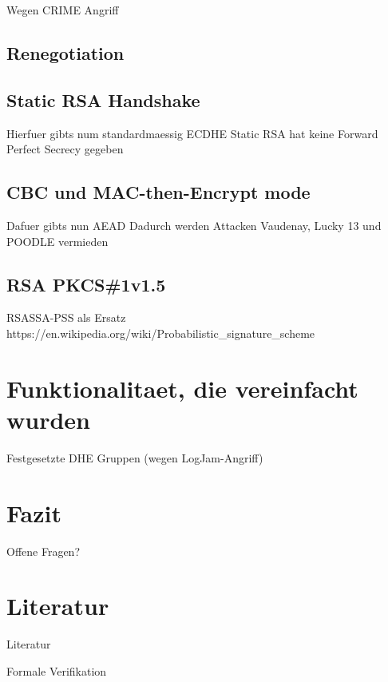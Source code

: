 \documentclass{f4_beamer_metropolis}
\begin{document}
\begin{frame}
Wegen CRIME Angriff
\end{frame}

\subsection{Renegotiation}

\begin{frame}

\end{frame}

\subsection{Static RSA Handshake}

\begin{frame}
Hierfuer gibts num standardmaessig ECDHE
Static RSA hat keine Forward Perfect Secrecy gegeben
\end{frame}

\subsection{CBC und MAC-then-Encrypt mode}

\begin{frame}
Dafuer gibts nun AEAD
Dadurch werden Attacken Vaudenay, Lucky 13 und POODLE vermieden
\end{frame}

\subsection{RSA PKCS\#1v1.5}

\begin{frame}
  RSASSA-PSS als Ersatz
  https://en.wikipedia.org/wiki/Probabilistic_signature_scheme
\end{frame}

\section{Funktionalitaet, die vereinfacht wurden}

\begin{frame}{}
Festgesetzte DHE Gruppen (wegen LogJam-Angriff)
\end{frame}

\section{Fazit}

\begin{frame}

\end{frame}

\begin{frame}[standout]
  Offene Fragen?
\end{frame}

\section{Literatur}

\begin{frame}[allowframebreaks]{Literatur}
  \printbibliography
\end{frame}

\appendix

\begin{frame}{Formale Verifikation}

\end{frame}
\end{document}
